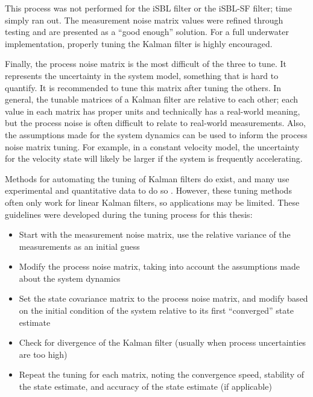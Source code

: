 \documentclass[12pt,a4paper]{report}
\begin{document}
This process was not performed for the iSBL filter or the iSBL-SF filter; time simply ran out. The measurement noise matrix values were refined through testing and are presented as a “good enough” solution. For a full underwater implementation, properly tuning the Kalman filter is highly encouraged.

Finally, the process noise matrix is the most difficult of the three to tune. It represents the uncertainty in the system model, something that is hard to quantify. It is recommended to tune this matrix after tuning the others. In general, the tunable matrices of a Kalman filter are relative to each other; each value in each matrix has proper units and technically has a real-world meaning, but the process noise is often difficult to relate to real-world measurements. Also, the assumptions made for the system dynamics can be used to inform the process noise matrix tuning. For example, in a constant velocity model, the uncertainty for the velocity state will likely be larger if the system is frequently accelerating.

Methods for automating the tuning of Kalman filters do exist, and many use experimental and quantitative data to do so \cite{kftuning}. However, these tuning methods often only work for linear Kalman filters, so applications may be limited. These guidelines were developed during the tuning process for this thesis:
\begin{itemize}[noitemsep,topsep=0pt,]
	\item Start with the measurement noise matrix, use the relative variance of the measurements as an initial guess
	\item Modify the process noise matrix, taking into account the assumptions made about the system dynamics
	\item Set the state covariance matrix to the process noise matrix, and modify based on the initial condition of the system relative to its first “converged” state estimate
	\item Check for divergence of the Kalman filter (usually when process uncertainties are too high)
	\item Repeat the tuning for each matrix, noting the convergence speed, stability of the state estimate, and accuracy of the state estimate (if applicable)
\end{itemize}



\end{document}
